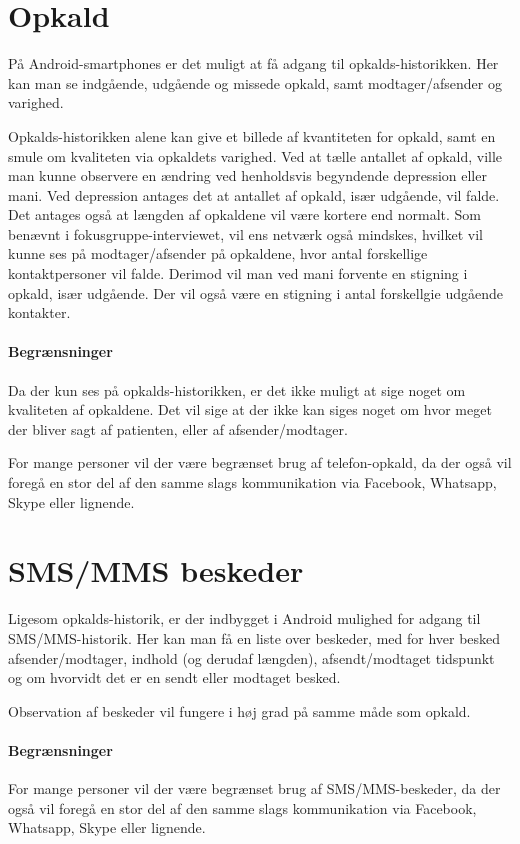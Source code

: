 \section{Opkald}
På Android-smartphones er det muligt at få adgang til opkalds-historikken.
Her kan man se indgående, udgående og missede opkald, samt modtager/afsender og varighed.

Opkalds-historikken alene kan give et billede af kvantiteten for opkald, samt en smule om kvaliteten via opkaldets varighed.
Ved at tælle antallet af opkald, ville man kunne observere en ændring ved henholdsvis begyndende depression eller mani.
Ved depression antages det at antallet af opkald, især udgående, vil falde.
Det antages også at længden af opkaldene vil være kortere end normalt.
Som benævnt i fokusgruppe-interviewet, vil ens netværk også mindskes, hvilket vil kunne ses på modtager/afsender på opkaldene, hvor antal forskellige kontaktpersoner vil falde.
Derimod vil man ved mani forvente en stigning i opkald, især udgående.
Der vil også være en stigning i antal forskellgie udgående kontakter.

\paragraph{Begrænsninger}
Da der kun ses på opkalds-historikken, er det ikke muligt at sige noget om kvaliteten af opkaldene.
Det vil sige at der ikke kan siges noget om hvor meget der bliver sagt af patienten, eller af afsender/modtager.

For mange personer vil der være begrænset brug af telefon-opkald, da der også vil foregå en stor del af den samme slags kommunikation via Facebook, Whatsapp, Skype eller lignende.

\section{SMS/MMS beskeder}
Ligesom opkalds-historik, er der indbygget i Android mulighed for adgang til SMS/MMS-historik.
Her kan man få en liste over beskeder, med for hver besked afsender/modtager, indhold (og derudaf længden), afsendt/modtaget tidspunkt og om hvorvidt det er en sendt eller modtaget besked.

Observation af beskeder vil fungere i høj grad på samme måde som opkald.

\paragraph{Begrænsninger}
For mange personer vil der være begrænset brug af SMS/MMS-beskeder, da der også vil foregå en stor del af den samme slags kommunikation via Facebook, Whatsapp, Skype eller lignende.

